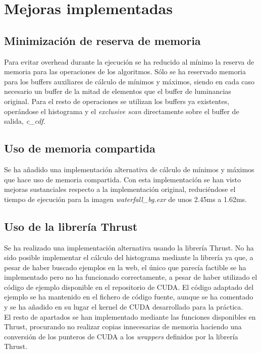 \documentclass[10pt,oneside,a4paper]{article}
\begin{document}
\section{Mejoras implementadas}
\subsection{Minimización de reserva de memoria}
Para evitar overhead durante la ejecución se ha reducido al mínimo la reserva de memoria para las operaciones de los algoritmos. Sólo se ha reservado memoria para los buffers auxiliares de cálculo de mínimos y máximos, siendo en cada caso necesario un buffer de la mitad de elementos que el buffer de luminancias original. Para el resto de operaciones se utilizan los buffers ya existentes, operándose el histograma y el \emph{exclusive scan} directamente sobre el buffer de salida, \emph{c\_cdf}.

\subsection{Uso de memoria compartida}
Se ha añadido una implementación alternativa de cálculo de mínimos y máximos que hace uso de memoria compartida. Con esta implementación se han visto mejoras sustanciales respecto a la implementación original, reduciéndose el tiempo de ejecución para la imagen \textit{waterfall\_bg.exr} de unos 2.45ms a 1.62ms.

\subsection{Uso de la librería Thrust}
Se ha realizado una implementación alternativa usando la librería Thrust. No ha sido posible implementar el cálculo del histograma mediante la librería ya que, a pesar de haber buscado ejemplos en la web, el único que parecía factible se ha implementado pero no ha funcionado correctamente, a pesar de haber utilizado el código de ejemplo disponible en el repositorio de CUDA. El código adaptado del ejemplo se ha mantenido en el fichero de código fuente, aunque se ha comentado y se ha añadido en su lugar el kernel de CUDA desarrollado para la práctica.\\

El resto de apartados se han implementado mediante las funciones disponibles en Thrust, procurando no realizar copias innecesarias de memoria haciendo una conversión de los punteros de CUDA a los \emph{wrappers} definidos por la librería Thrust.\\
\end{document}
